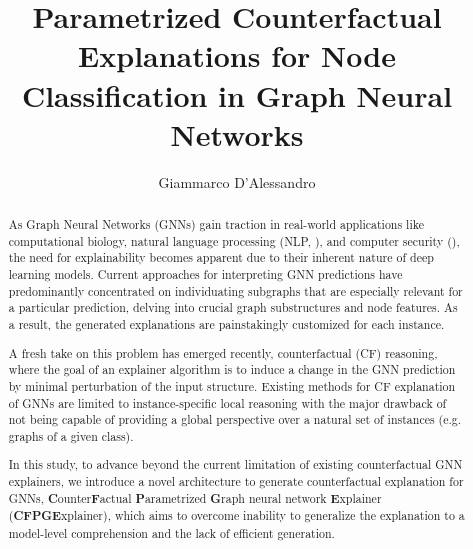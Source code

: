 \documentclass[binding=0.6cm]{sapthesis}
\title{Parametrized Counterfactual Explanations for Node Classification in Graph Neural Networks}
\author{Giammarco D'Alessandro}
\begin{document}
\frontmatter
\maketitle
\dedication{Dedicato a\\Fulmine di Pegasus}


\begin{abstract}
As Graph Neural Networks (GNNs) gain traction in real-world applications like computational biology, natural language processing (NLP, \cite{wu2022-NLP-graph}), and computer security (\cite{zhou2018-GraphNN}), the need for explainability becomes apparent due to their inherent nature of  deep learning models. Current approaches for interpreting GNN predictions have predominantly concentrated on individuating subgraphs that are especially relevant for a particular prediction, delving into crucial graph substructures and node features. As a result, the generated explanations are painstakingly customized for each instance. 

A fresh take on this problem has emerged recently, counterfactual (CF) reasoning, where the goal of an explainer algorithm is to induce a change in the GNN prediction by minimal perturbation of the input structure. Existing methods for CF explanation of GNNs are limited to instance-specific local reasoning with the major drawback of not being capable of providing a global perspective over a natural set of instances (e.g. graphs of a given class).

In this study, to advance beyond the current limitation of existing counterfactual GNN explainers, we introduce a novel architecture to generate counterfactual explanation for GNNs, \textbf{C}ounter\textbf{F}actual \textbf{P}arametrized \textbf{G}raph neural network \textbf{E}xplainer (\textbf{CFPGE}xplainer), which aims to overcome inability to generalize the explanation to a model-level comprehension and the lack of efficient generation. 




\end{abstract}
\end{document}
